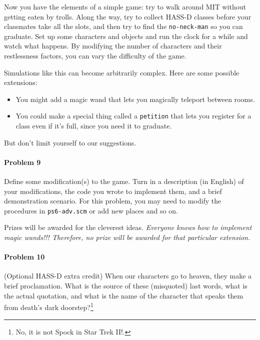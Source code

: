 Now you have the elements of a simple game: try to walk around MIT
without getting eaten by trolls.  Along the way, try to collect HASS-D
classes before your classmates take all the slots, and then try to
find the {\tt no-neck-man} so you can graduate.    Set up some 
characters and objects and run the clock for a while and watch what
happens.  By modifying the number of characters and their restlessness
factors, you can vary the difficulty of the game.

Simulations like this can become arbitrarily complex.  Here are some
possible extensions:

\begin{itemize}
\item
You might add a magic wand that lets you magically teleport between
rooms.  

\item
You could make a special thing called a {\tt petition} that lets you
register for a class even if it's full, since you need it to graduate.
\end{itemize}

\noindent
But don't limit yourself to our suggestions.

\paragraph{Problem 9}

Define some modification(s) to the game.  Turn in a description (in
English) of your modifications, the code you wrote to implement them,
and a brief demonstration scenario.  For this problem, you may need to
modify the procedures in {\tt ps6-adv.scm} or add new places and so
on. 

Prizes will be awarded for the cleverest ideas.  {\sl Everyone
knows how to implement magic wands!!! Therefore, no prize will be
awarded for that particular extension.}

\paragraph{Problem 10} (Optional HASS-D extra credit)
When our characters go to heaven, they make a brief proclamation.
What is the source of these (misquoted) last words, what is the actual
quotation, and what is the name of the character that speaks them from
death's dark doorstep?\footnote{No, it is not Spock in Star Trek II!.}



